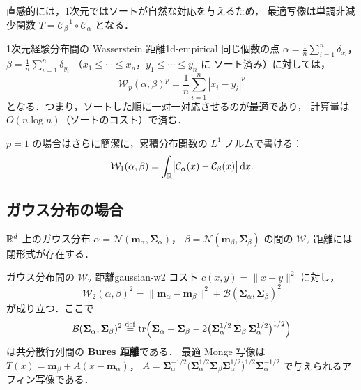 直感的には，1次元ではソートが自然な対応を与えるため，
最適写像は単調非減少関数
$T = \mathcal{C}_\beta^{-1} \circ \mathcal{C}_\alpha$
となる．

\begin{example}{1次元経験分布間の Wasserstein 距離}{1d-empirical}
同じ個数の点 $\alpha = \frac{1}{n}\sum_{i=1}^n \delta_{x_i}$，
$\beta = \frac{1}{n}\sum_{i=1}^n \delta_{y_i}$
（$x_1 \leq \cdots \leq x_n$，$y_1 \leq \cdots \leq y_n$ に
ソート済み）に対しては，
\[
  \mathcal{W}_p(\alpha, \beta)^p
  = \frac{1}{n}\sum_{i=1}^{n} |x_i - y_i|^p
\]
となる．つまり，ソートした順に一対一対応させるのが最適であり，
計算量は $O(n \log n)$（ソートのコスト）で済む．
\end{example}

$p = 1$ の場合はさらに簡潔に，累積分布関数の
$L^1$ ノルムで書ける：
\[
  \mathcal{W}_1(\alpha, \beta)
  = \int_{\mathbb{R}}
  \bigl|\mathcal{C}_\alpha(x) - \mathcal{C}_\beta(x)\bigr|
  \, \mathrm{d}x.
\]

\subsection{ガウス分布の場合}\label{subsec:gaussian}

$\mathbb{R}^d$ 上のガウス分布
$\alpha = \mathcal{N}(\mathbf{m}_\alpha, \boldsymbol{\Sigma}_\alpha)$，
$\beta = \mathcal{N}(\mathbf{m}_\beta, \boldsymbol{\Sigma}_\beta)$
の間の $\mathcal{W}_2$ 距離には閉形式が存在する．

\begin{theorem}{ガウス分布間の $\mathcal{W}_2$ 距離}{gaussian-w2}
コスト $c(x, y) = \|x - y\|^2$ に対し，
\begin{equation}\label{eq:gaussian-w2}
  \mathcal{W}_2(\alpha, \beta)^2
  = \|\mathbf{m}_\alpha - \mathbf{m}_\beta\|^2
  + \mathcal{B}(\boldsymbol{\Sigma}_\alpha, \boldsymbol{\Sigma}_\beta)^2
\end{equation}
が成り立つ．ここで
\begin{equation}\label{eq:bures}
  \mathcal{B}(\boldsymbol{\Sigma}_\alpha, \boldsymbol{\Sigma}_\beta)^2
  \overset{\mathrm{def}}{=} \operatorname{tr}\!\left(
    \boldsymbol{\Sigma}_\alpha + \boldsymbol{\Sigma}_\beta
    - 2\bigl(
      \boldsymbol{\Sigma}_\alpha^{1/2}\,
      \boldsymbol{\Sigma}_\beta\,
      \boldsymbol{\Sigma}_\alpha^{1/2}
    \bigr)^{1/2}
  \right)
\end{equation}
は共分散行列間の \textbf{Bures 距離}である．
最適 Monge 写像は
$T(x) = \mathbf{m}_\beta + A(x - \mathbf{m}_\alpha)$，
$A = \boldsymbol{\Sigma}_\alpha^{-1/2}
\bigl(\boldsymbol{\Sigma}_\alpha^{1/2}
\boldsymbol{\Sigma}_\beta
\boldsymbol{\Sigma}_\alpha^{1/2}\bigr)^{1/2}
\boldsymbol{\Sigma}_\alpha^{-1/2}$
で与えられるアフィン写像である．
\end{theorem}

